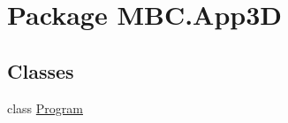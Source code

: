 \hypertarget{namespace_m_b_c_1_1_app3_d}{\section{Package M\-B\-C.\-App3\-D}
\label{namespace_m_b_c_1_1_app3_d}
}
\subsection*{Classes}
\begin{DoxyCompactItemize}
\item 
class \hyperlink{class_m_b_c_1_1_app3_d_1_1_program}{Program}
\end{DoxyCompactItemize}
